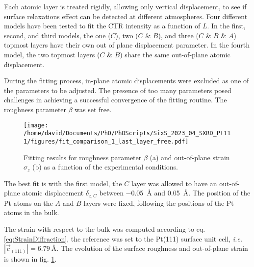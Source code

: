 Each atomic layer is treated rigidly, allowing only vertical displacement, to see if surface relaxations effect can be detected at different atmospheres.
Four different models have been tested to fit the CTR intensity as a function of $L$.
In the first, second, and third models, the one ($C$), two ($C$ \& $B$), and three ($C$ \& $B$ \& $A$) topmost layers have their own out of plane displacement parameter.
In the fourth model, the two topmost layers ($C$ \& $B$) share the same out-of-plane atomic displacement.

During the fitting process, in-plane atomic displacements were excluded as one of the parameters to be adjusted.
The presence of too many parameters posed challenges in achieving a successful convergence of the fitting routine.
The roughness parameter $\beta$ was set free.

\begin{figure}[!htb]
    \centering
    \texttt{[image: /home/david/Documents/PhD/PhDScripts/SixS\_2023\_04\_SXRD\_Pt111/figures/fit\_comparison\_1\_last\_layer\_free.pdf]}
    \caption{
        Fitting results for roughness parameter $\beta$ (a) and out-of-plane strain $\sigma_z$ (b) as a function of the experimental conditions.
    }
    \label{fig:CTRFit111}
\end{figure}

The best fit is with the first model, the $C$ layer was allowed to have an out-of-plane atomic displacement $\delta_{z, C}$ between \qty{-0.05}{\angstrom} and \qty{0.05}{\angstrom}.
The position of the Pt atoms on the $A$ and $B$ layers were fixed, following the positions of the Pt atoms in the bulk.

The strain with respect to the bulk was computed according to eq. \ref{eq:StrainDiffraction}, the reference was set to the Pt(111) surface unit cell, \textit{i.e.} $|\vec{c}_{(111)}| = \qty{6.79}{\angstrom}$.
The evolution of the surface roughness and out-of-plane strain is shown in fig. \ref{fig:CTRFit111}.


